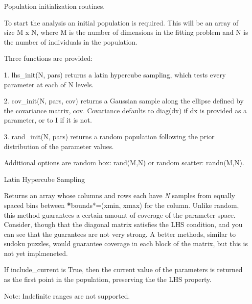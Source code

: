 \documentclass[letterpaper,10pt,english]{sphinxmanual}
\begin{document}
\label{api/initpop:module-refl1d.initpop}
Population initialization routines.

To start the analysis an initial population is required.  This will be
an array of size M x N, where M is the number of dimensions in the fitting
problem and N is the number of individuals in the population.

Three functions are provided:

1. lhs\_init(N, pars) returns a latin hypercube sampling, which tests every
parameter at each of N levels.

2. cov\_init(N, pars, cov) returns a Gaussian sample along the ellipse
defined by the covariance matrix, cov.  Covariance defaults to
diag(dx) if dx is provided as a parameter, or to I if it is not.

3. rand\_init(N, pars) returns a random population following the
prior distribution of the parameter values.

Additional options are random box: rand(M,N) or random scatter: randn(M,N).

\begin{fulllineitems}
\label{api/initpop:refl1d.initpop.lhs_init}
Latin Hypercube Sampling

Returns an array whose columns and rows each have \emph{N} samples from
equally spaced bins between {\color{red}\bfseries{}*}bounds*=(xmin, xmax) for the column.
Unlike random, this method guarantees a certain amount of coverage
of the parameter space.  Consider, though that the diagonal matrix
satisfies the LHS condition, and you can see that the guarantees are
not very strong.  A better methods, similar to sudoku puzzles, would
guarantee coverage in each block of the matrix, but this is not
yet implmeneted.

If include\_current is True, then the current value of the parameters
is returned as the first point in the population, preserving the the
LHS property.

Note: Indefinite ranges are not supported.

\end{fulllineitems}

\end{document}
